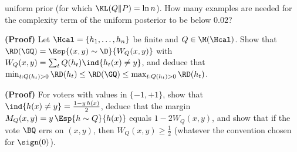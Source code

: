 \begin{exercises}
\begin{exercise}
uniform prior (for which $\KL(Q\|P)=\ln n$). How many examples are needed for
the complexity term of the uniform posterior to be below $0.02$?
\end{exercise}
\begin{exercise}
\textbf{(Proof)} Let $\Hcal=\{h_1,\dots,h_n\}$ be finite and $Q\in\M(\Hcal)$.
Show that $\RD(\GQ)=\Esp{(x,y)\sim\D}{W_Q(x,y)}$ with
$W_Q(x,y)=\sum_tQ(h_t)\ind{h_t(x)\neq y}$, and deduce that
$\min_{t:Q(h_t)>0}\RD(h_t)\leq\RD(\GQ)\leq\max_{t:Q(h_t)>0}\RD(h_t)$.
\end{exercise}
\begin{exercise}
\textbf{(Proof)} For voters with values in $\{-1,+1\}$, show that
$\ind{h(x)\neq y}=\frac{1-y\,h(x)}{2}$, deduce that the margin
$M_Q(x,y)=y\,\Esp{h\sim Q}{h(x)}$ equals $1-2W_Q(x,y)$, and show that if the
vote $\BQ$ errs on $(x,y)$, then $W_Q(x,y)\geq\frac12$ (whatever the convention
chosen for $\sign(0)$).
\end{exercise}
\end{exercises}
